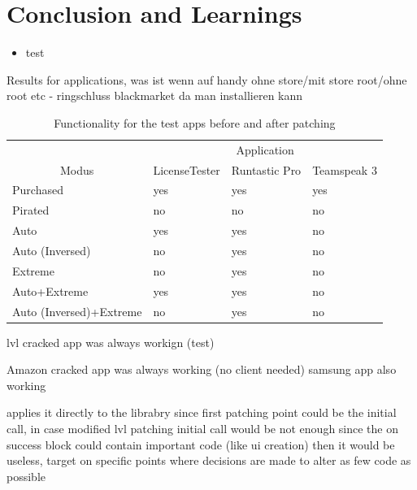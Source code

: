 \section{Conclusion and Learnings} \label{section:luckypatcher-learnings}
\begin{itemize}
    \item test
\end{itemize}


Results for applications, was ist wenn auf handy ohne store/mit store root/ohne root etc - ringschluss blackmarket da man installieren kann


\begin{table}[h]
\centering
\begin{tabular}{llll}
                                             & \multicolumn{3}{c}{Application}             \\
\multicolumn{1}{c|}{Modus}                   & LicenseTester & Runtastic Pro & Teamspeak 3 \\ \hline
\multicolumn{1}{l|}{Purchased}               & yes           & yes           & yes         \\
\multicolumn{1}{l|}{Pirated}                 & no            & no            & no          \\
\multicolumn{1}{l|}{Auto}                    & yes           & yes           & no          \\
\multicolumn{1}{l|}{Auto (Inversed)}         & no            & yes           & no          \\
\multicolumn{1}{l|}{Extreme}                 & no            & yes           & no          \\
\multicolumn{1}{l|}{Auto+Extreme}            & yes           & yes           & no          \\
\multicolumn{1}{l|}{Auto (Inversed)+Extreme} & no            & yes           & no
\end{tabular}
\caption{Functionality for the test apps before and after patching}
\label{table:functionality}
\end{table}

lvl cracked app was always workign (test)

Amazon cracked app was always working (no client needed)
samsung app also working

applies it directly to the librabry since first patching point could be the initial call, in case modified lvl patching initial call would be not enough since the on success block could contain important code (like ui creation) then it would be useless, target on specific points where decisions are made to alter as few code as possible

